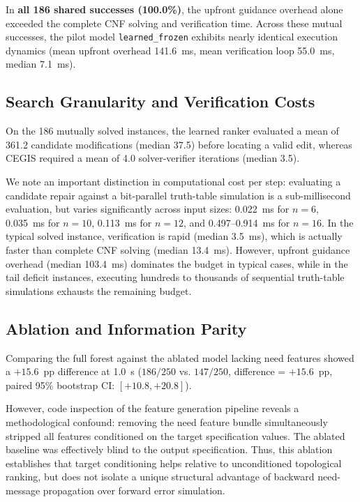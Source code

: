 \documentclass[11pt]{article}
\begin{document}
In \textbf{all 186 shared successes (100.0\%)}, the upfront guidance overhead alone exceeded the complete CNF solving and verification time. Across these mutual successes, the pilot model \texttt{learned\_frozen} exhibits nearly identical execution dynamics (mean upfront overhead 141.6~ms, mean verification loop 55.0~ms, median 7.1~ms).

\subsection{Search Granularity and Verification Costs}
On the 186 mutually solved instances, the learned ranker evaluated a mean of 361.2 candidate modifications (median 37.5) before locating a valid edit, whereas CEGIS required a mean of 4.0 solver-verifier iterations (median 3.5). 

We note an important distinction in computational cost per step: evaluating a candidate repair against a bit-parallel truth-table simulation is a sub-millisecond evaluation, but varies significantly across input sizes: 0.022~ms for $n=6$, 0.035~ms for $n=10$, 0.113~ms for $n=12$, and 0.497--0.914~ms for $n=16$. In the typical solved instance, verification is rapid (median 3.5~ms), which is actually faster than complete CNF solving (median 13.4~ms). However, upfront guidance overhead (median 103.4~ms) dominates the budget in typical cases, while in the tail deficit instances, executing hundreds to thousands of sequential truth-table simulations exhausts the remaining budget.

\subsection{Ablation and Information Parity}
Comparing the full forest against the ablated model lacking need features showed a $+15.6$~pp difference at 1.0~s ($186/250$ vs. $147/250$, difference = $+15.6$~pp, paired 95\% bootstrap CI: $[+10.8, +20.8]$). 

However, code inspection of the feature generation pipeline reveals a methodological confound: removing the need feature bundle simultaneously stripped all features conditioned on the target specification values. The ablated baseline was effectively blind to the output specification. Thus, this ablation establishes that target conditioning helps relative to unconditioned topological ranking, but does not isolate a unique structural advantage of backward need-message propagation over forward error simulation.
\end{document}
